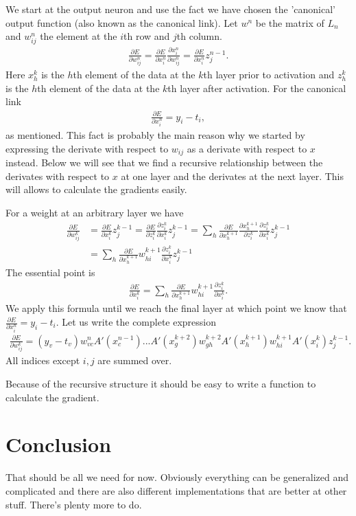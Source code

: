 \documentclass[12pt]{article}
\numberwithin{equation}{section}
\begin{document}
We start at the output neuron and use the fact we have chosen the 'canonical' output function (also known as the canonical link). Let \(w^n\) be the matrix of \(L_n\) and \(w^n_{ij}\) the element at the \(i\)th row and \(j\)th column.  
\begin{align}
\frac{\partial E}{\partial w_{ij}^n} =  \frac{\partial E}{\partial x^n_i}\frac{\partial x^n_i}{\partial w^n_{ij}} = \frac{\partial E}{\partial x^n_i}z^{n-1}_j.
\end{align}
Here \(x^k_h\) is the \(h\)th element of the data at the \(k\)th layer prior to activation and \(z^k_h\) is the \(h\)th element of the data at the \(k\)th layer after activation. For the canonical link
\begin{align}
\frac{\partial E}{\partial x^n_i} = y_i-t_i,
\end{align}
as mentioned. This fact is probably the main reason why we started by expressing the derivate with respect to \(w_{ij}\) as a derivate with respect to \(x\) instead. Below we will see that we find a recursive relationship between the derivates with respect to \(x\) at one layer and the derivates at the next layer. This will allows to calculate the gradients easily.

For a weight at an arbitrary layer we have
\begin{align}
\frac{\partial E}{\partial w_{ij}^k} &=  \frac{\partial E}{\partial x^k_i}z^{k-1}_j = \frac{\partial E}{\partial z^k_i}\frac{\partial z^k_i}{\partial x_i^k} z^{k-1}_j = \sum_h \frac{\partial E}{\partial x^{k+1}_h}\frac{\partial x^{k+1}_h}{\partial z^k_i}\frac{\partial z^k_i}{\partial x_i^k} z^{k-1}_j \nonumber \\
&= \sum_h \frac{\partial E}{\partial x^{k+1}_h}w^{k+1}_{hi}\frac{\partial z^k_i}{\partial x_i^k} z^{k-1}_j
\end{align}
The essential point is
\begin{align}
 \frac{\partial E}{\partial x^k_i} = \sum_h \frac{\partial E}{\partial x^{k+1}_h}w^{k+1}_{hi}\frac{\partial z^k_i}{\partial x_i^k}.
\end{align}
We apply this formula until we reach the final layer at which point we know that \(\frac{\partial E}{\partial x^n_i} = y_i - t_i\). Let us write the complete expression
\begin{align}
\frac{\partial E}{\partial w^k_{ij}} =  (y_v-t_v)w_{vc}^nA'(x_c^{n-1})...A'(x_g^{k+2})w^{k+2}_{gh}A'(x_h^{k+1})w^{k+1}_{hi}A'(x_i^{k})z_j^{k-1}.
\end{align}
All indices except \(i,j\) are summed over.

Because of the recursive structure it should be easy to write a function to calculate the gradient.


\section{Conclusion}
That should be all we need for now. Obviously everything can be generalized and complicated and there are also different implementations that are better at other stuff. There's plenty more to do.
\end{document}
